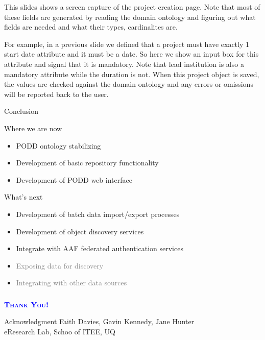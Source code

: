 \documentclass[ignorenonframetext,compress]{beamer}
\begin{document}
This slides shows a screen capture of the project creation page.
Note that most of these fields are generated by reading the domain
ontology and figuring out what fields are needed and what their types,
cardinalites are.

For example, in a previous slide we defined that a project must have 
exactly 1 start date attribute and it must be a date. So here we show 
an input box for this attribute and signal that it is mandatory. Note
that lead institution is also a mandatory attribute while the duration
is not. When this project object is saved, the values are checked against
the domain ontology and any errors or omissions will be reported back
to the user.

\begin{frame}{Conclusion}
\begin{block}{Where we are now}
\begin{itemize}
\item PODD ontology stabilizing
\item Development of basic repository functionality
\item Development of PODD web interface
\end{itemize}
\end{block}
\pause
\begin{block}{What's next}
\begin{itemize}
\item Development of batch data import/export processes
\item Development of object discovery services
\item Integrate with AAF federated authentication services
\item \textcolor{gray}{Exposing data for discovery}
\item \textcolor{gray}{Integrating with other data sources}
\end{itemize}
\end{block}
\end{frame}

\begin{frame}
	\frametitle{}
    \begin{center}
\Huge \textsc{\textcolor{blue}{\textbf{Thank You!}}}
\end{center}
\vspace{+20pt}
\begin{block}{Acknowledgment}
Faith Davies, Gavin Kennedy, Jane Hunter\\
eResearch Lab, Schoo of ITEE, UQ
\end{block}
\end{frame}
\end{document}
